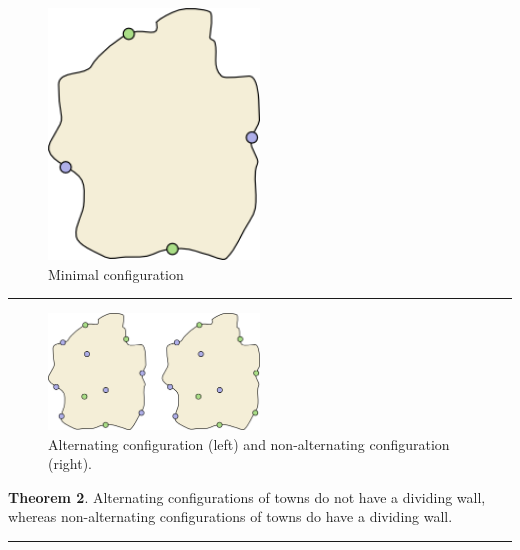 \documentclass[
  letterpaper,
  DIV=11,
  numbers=noendperiod]{scrartcl}
\begin{document}
\begin{figure}

{\centering \includegraphics[width=0.5\textwidth,height=\textheight]{wall-4.png}

}

\caption{Minimal configuration}

\end{figure}

\begin{center}\rule{0.5\linewidth}{0.5pt}\end{center}

\begin{figure}

{\centering \includegraphics[width=0.5\textwidth,height=\textheight]{wall-5.png}

}

\caption{Alternating configuration (left) and non-alternating
configuration (right).}

\end{figure}

\textbf{Theorem 2}. Alternating configurations of towns do not have a
dividing wall, whereas non-alternating configurations of towns do have a
dividing wall.

\begin{center}\rule{0.5\linewidth}{0.5pt}\end{center}
\end{document}
